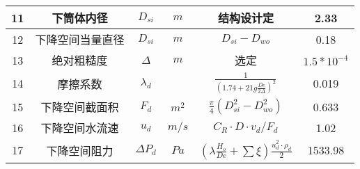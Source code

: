 \begin{table}[H]
{\begin{tabular}{|c|c|c|c|c|c|}
            11   & 下筒体内径       & $ D_{si} $     & $ m $      & 结构设计定                                                            & 2.33             \\ \hline
            12   & 下降空间当量直径 & $ D_{si} $     & $ m $      & $ D_{si} - D_{wo} $                                                   & 0.18             \\ \hline
            13   & 绝对粗糙度       & $ \Delta $     & $ m $      & 选定                                                                  & $ 1.5*10^{-4} $  \\ \hline
            14   & 摩擦系数         & $ \lambda_d $  &            & $ \frac{1}{(1.74+21g \frac{De}{2 \Delta})^2} $                        & 0.019            \\ \hline
            15   & 下降空间截面积   & $ F_d $        & $ m^2 $    & $ \frac{\pi}{4}(D_{si}^{2}-D_{wo}^{2}) $                              & 0.633            \\ \hline
            16   & 下降空间水流速   & $ u_d $        & $ m/s $    & $ C_R \cdot D \cdot v_d / F_d $                                       & 1.02             \\ \hline
            17   & 下降空间阻力     & $ \Delta P_d $ & $ Pa $     & $ (\lambda \frac{H_o}{De}+\sum \xi)\frac{u_{d}^{2} \cdot \rho_d}{2} $ & 1533.98          \\ \hline
        \end{tabular}
    }
\end{table}

\newpage
